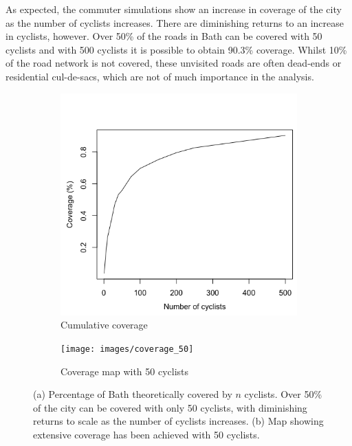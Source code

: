 \documentclass[11pt,twosided,a4paper]{report}
\begin{document}
As expected, the commuter simulations show an increase in coverage of the city as the number of cyclists increases. There are diminishing returns to an increase in cyclists, however. Over 50\% of the roads in Bath can be covered with 50 cyclists and with 500 cyclists it is possible to obtain 90.3\% coverage. Whilst 10\% of the road network is not covered, these unvisited roads are often dead-ends or residential cul-de-sacs, which are not of much importance in the analysis.



\begin{figure}[!tb]
\centering
\begin{subfigure}[b]{0.49\textwidth}
  \includegraphics[width=1\linewidth]{images/coverage}
  \caption{Cumulative coverage}
  \label{fig:coverage}
\end{subfigure}
\hfill
\begin{subfigure}[b]{0.49\textwidth}
  \texttt{[image: images/coverage\_50]}
  \caption{Coverage map with 50 cyclists}
  \label{fig:coverage_50}
\end{subfigure}
\caption[Cyclist coverage.]{ (a) Percentage of Bath theoretically covered by $n$ cyclists. Over 50\% of the city can be covered with only 50 cyclists, with diminishing returns to scale as the number of cyclists increases. (b) Map showing extensive coverage has been achieved with 50 cyclists.}
\label{fig:coverage}
\end{figure}
\end{document}
